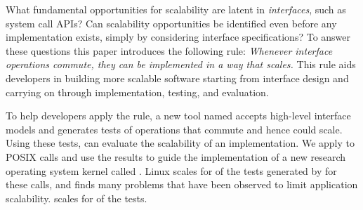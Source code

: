 What fundamental opportunities for scalability are latent in
\emph{interfaces}, such as system call APIs? Can scalability
opportunities be identified even before any implementation exists,
simply by considering interface specifications?
To answer these
questions this paper introduces the following rule:
\emph{Whenever interface operations commute,
they can be implemented in a way that scales.}
This rule aids developers in building more scalable software starting from
interface design and
carrying on through implementation, testing, and evaluation.

To help developers apply the rule,
a new tool named \tool
accepts high-level interface models and generates
tests of operations that commute and hence could scale. Using
these tests, \tool can
evaluate the scalability of an implementation.  We apply \tool to
 POSIX calls and use the results to
guide the implementation of a new research operating system kernel
called \sys.
%
Linux scales for
 of
the  tests generated by \tool for these
calls, and \tool finds many problems that have been observed to limit
application scalability.
%
\sys scales for
 of the
tests.
